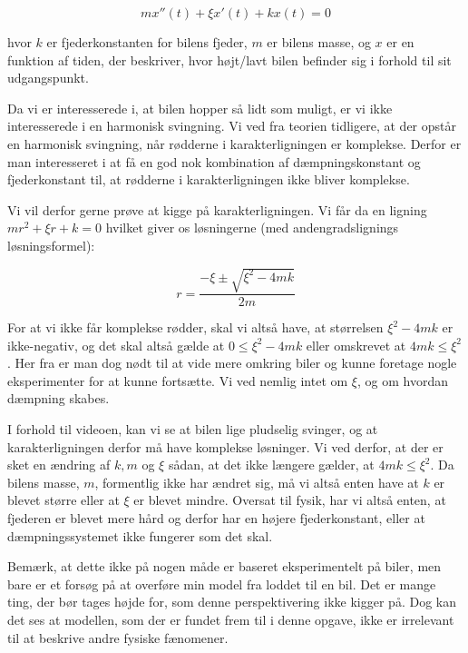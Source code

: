 $$mx''(t)+\xi x'(t) + k x(t) = 0$$

hvor $k$ er fjederkonstanten for bilens fjeder, $m$ er bilens masse, og $x$ er en funktion af tiden, der beskriver, hvor højt/lavt bilen befinder sig i forhold til sit udgangspunkt.

Da vi er interesserede i, at bilen hopper så lidt som muligt, er vi ikke interesserede i en harmonisk svingning. 
Vi ved fra teorien tidligere, at der opstår en harmonisk svingning, når rødderne i karakterligningen er komplekse. 
Derfor er man interesseret i at få en god nok kombination af dæmpningskonstant og fjederkonstant til, at rødderne i karakterligningen ikke bliver komplekse. 

Vi vil derfor gerne prøve at kigge på karakterligningen. 
Vi får da en ligning $mr^2 + \xi r + k = 0$ hvilket giver os løsningerne (med andengradslignings løsningsformel):

$$r = \dfrac{-\xi \pm \sqrt{\xi ^2 - 4mk}}{2m}$$

For at vi ikke får komplekse rødder, skal vi altså have, at størrelsen $\xi ^2 -4mk$ er ikke-negativ, og det skal altså gælde at $0 \leq \xi ^2 -4mk $ eller omskrevet at $4mk \leq \xi ^2 $.
Her fra er man dog nødt til at vide mere omkring biler og kunne foretage nogle eksperimenter for at kunne fortsætte. 
Vi ved nemlig intet om $\xi$, og om hvordan dæmpning skabes. 

I forhold til videoen, kan vi se at bilen lige pludselig svinger, og at karakterligningen derfor må have komplekse løsninger.
Vi ved derfor, at der er sket en ændring af $k,m$ og $\xi$ sådan, at det ikke længere gælder, at $4mk \leq \xi ^2 $.
Da bilens masse, $m$, formentlig ikke har ændret sig, må vi altså enten have at $k$ er blevet større eller at $\xi$ er blevet mindre. 
Oversat til fysik, har vi altså enten, at fjederen er blevet mere hård og derfor har en højere fjederkonstant, eller at dæmpningssystemet ikke fungerer som det skal.

\vspace{0.75cm}

Bemærk, at dette ikke på nogen måde er baseret eksperimentelt    på biler, men bare er et forsøg på at overføre min model fra loddet til en bil. 
Det er mange ting, der bør tages højde for, som denne perspektivering ikke kigger på.
Dog kan det ses at modellen, som der er fundet frem til i denne opgave, ikke er irrelevant til at beskrive andre fysiske fænomener.

